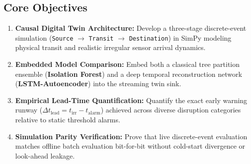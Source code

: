 \documentclass[11pt,a4paper,oneside]{article}
\begin{document}
\subsection{Core Objectives}
\begin{enumerate}[leftmargin=1.8em, itemsep=2pt, topsep=2pt]
    \item \textbf{Causal Digital Twin Architecture:} Develop a three-stage discrete-event simulation (\texttt{Source} $\rightarrow$ \texttt{Transit} $\rightarrow$ \texttt{Destination}) in SimPy modeling physical transit and realistic irregular sensor arrival dynamics.
    \item \textbf{Embedded Model Comparison:} Embed both a classical tree partition ensemble (\textbf{Isolation Forest}) and a deep temporal reconstruction network (\textbf{LSTM-Autoencoder}) into the streaming twin sink.
    \item \textbf{Empirical Lead-Time Quantification:} Quantify the exact early warning runway ($\Delta t_{\text{lead}} = t_{\text{irr}} - t_{\text{alarm}}$) achieved across diverse disruption categories relative to static threshold alarms.
    \item \textbf{Simulation Parity Verification:} Prove that live discrete-event evaluation matches offline batch evaluation bit-for-bit without cold-start divergence or look-ahead leakage.
\end{enumerate}
\end{document}
